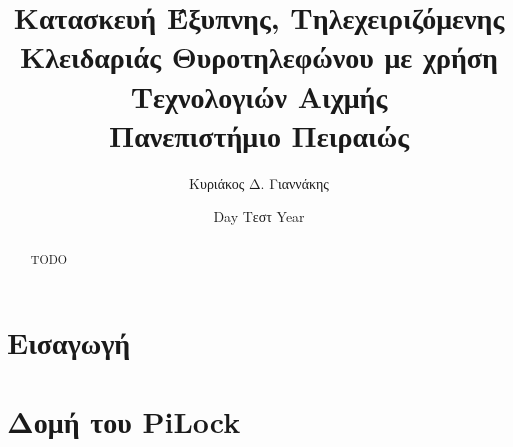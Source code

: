 \documentclass[12pt]{report}
\title{
    {Κατασκευή Έξυπνης, Τηλεχειριζόμενης Κλειδαριάς Θυροτηλεφώνου με χρήση Τεχνολογιών Αιχμής }\\
    {\large Πανεπιστήμιο Πειραιώς}
}
\author{Κυριάκος Δ. Γιαννάκης}
\date{Day Τεστ Year}
\begin{document}
    \maketitle
    
    \begin{abstract}
        TODO
    \end{abstract}
    
    \tableofcontents
    
    \chapter{Εισαγωγή}
    

    \chapter{Δομή του PiLock}
    

    
    
\end{document}
